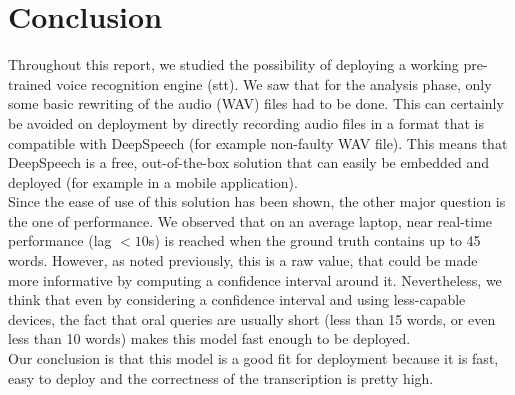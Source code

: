 \documentclass[12pt]{article}
\begin{document}
\section{Conclusion}
Throughout this report, we studied the possibility of deploying a working pre-trained voice recognition engine (\gls{stt}). We saw that for the analysis phase, only some basic rewriting of the audio (WAV) files had to be done. This can certainly be avoided on deployment by directly recording audio files in a format that is compatible with DeepSpeech (for example non-faulty WAV file). This means that DeepSpeech is a free, out-of-the-box solution that can easily be embedded and deployed (for example in a mobile application). \\
Since the ease of use of this solution has been shown, the other major question is the one of performance. We observed that on an average laptop, near real-time performance (lag $<10$s) is reached when the ground truth contains up to 45 words. However, as noted previously, this is a raw value, that could be made more informative by computing a confidence interval around it. Nevertheless, we think that even by considering a confidence interval and using less-capable devices, the fact that oral queries are usually short (less than 15 words, or even less than 10 words) makes this model fast enough to be deployed. \\
Our conclusion is that this model is a good fit for deployment because it is fast, easy to deploy and the correctness of the transcription is pretty high.


\newpage
\appendix
\end{document}
